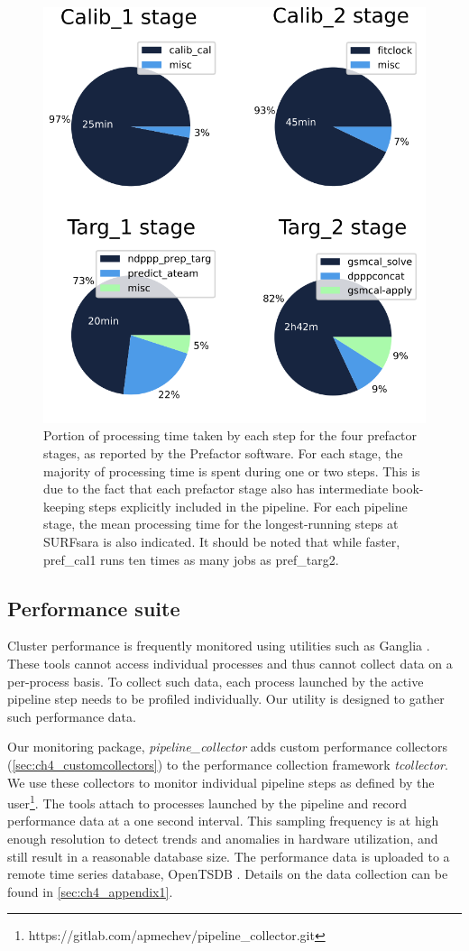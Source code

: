 \begin{figure}[H]
    \centering
    \includegraphics[width=0.5\linewidth]{ch4/figures/fig2/4pies_thesis.png}
      \caption[Portion of processing time taken by each step for the four prefactor stages.]{Portion of processing time taken by each step for the four prefactor stages, as reported by the Prefactor software. For each stage, the majority of processing time is spent during one or two steps. This is due to the fact that each prefactor stage also has intermediate book-keeping steps explicitly included in the pipeline. For each pipeline stage, the mean processing time for the longest-running steps at SURFsara is also indicated. It should be noted that while faster, pref\_cal1 runs ten times as many jobs as pref\_targ2. }
	\label{fig:ch4_4_steps_pies}
\end{figure}


\subsection{Performance suite}
Cluster performance is frequently monitored using utilities such as Ganglia \citep[][discussed in Section \ref{sec:ch4_related}]{ganglia}. These tools cannot access individual processes and thus cannot collect data on a per-process basis. To collect such data, each process launched by the active pipeline step needs to be profiled individually. Our utility is designed to gather such performance data.

Our monitoring package, \textit{pipeline\_collector} adds custom performance collectors (\ref{sec:ch4_customcollectors}) to the performance collection framework \textit{tcollector}. We use these collectors to monitor individual pipeline steps as defined by the user\footnote{https://gitlab.com/apmechev/pipeline\_collector.git}. The tools attach to processes launched by the pipeline and record performance data at a one second interval. This sampling frequency is at high enough resolution to detect trends and anomalies in hardware utilization, and still result in a reasonable database size. The performance data is uploaded to a remote time series database, OpenTSDB \citep{opentsdbsite}. Details on the data collection can be found in  \ref{sec:ch4_appendix1}.

